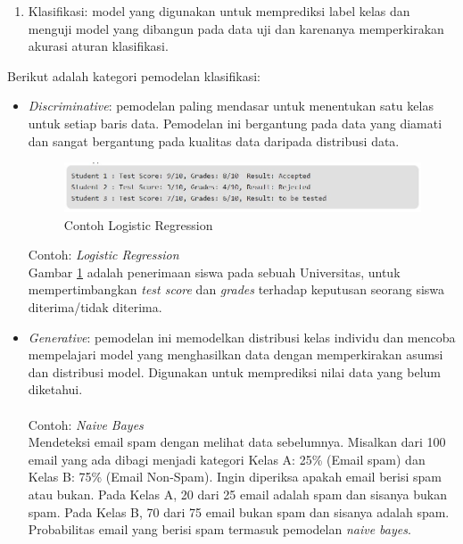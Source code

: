 \documentclass[a4paper,twoside]{article}
\begin{document}
\begin{enumerate}
\begin{enumerate}
\item
Klasifikasi: model yang digunakan untuk memprediksi label kelas dan menguji model yang dibangun pada data uji dan karenanya memperkirakan akurasi aturan klasifikasi.
\end{enumerate}
\vspace{0.3cm}
\noindent Berikut adalah kategori pemodelan klasifikasi:
\begin{itemize}

\item 
\textit{Discriminative}: pemodelan paling mendasar untuk menentukan satu kelas untuk setiap baris data. Pemodelan ini bergantung pada data yang diamati dan sangat bergantung pada kualitas data daripada distribusi data.

\begin{figure}[H]
	\centering
	\includegraphics[scale=0.6]{klasifikasi1}
	\caption{Contoh Logistic Regression}
	\label{fig:klasifikasi1}
\end{figure}

Contoh: \textit{Logistic Regression}\\
Gambar \ref{fig:klasifikasi1} adalah penerimaan siswa pada sebuah Universitas, untuk mempertimbangkan \textit{test score} dan \textit{grades} terhadap keputusan seorang siswa diterima/tidak diterima.

\item 
\textit{Generative}: pemodelan ini memodelkan distribusi kelas individu dan mencoba mempelajari model yang menghasilkan data dengan memperkirakan asumsi dan distribusi model. Digunakan untuk memprediksi nilai data yang belum diketahui. \\\\
Contoh: \textit{Naive Bayes} \\
Mendeteksi email spam dengan melihat data sebelumnya. Misalkan dari 100 email yang ada dibagi menjadi kategori Kelas A: 25\% (Email spam) dan Kelas B: 75\% (Email Non-Spam). Ingin diperiksa apakah email berisi  spam atau bukan. Pada Kelas A, 20 dari 25 email adalah spam dan sisanya bukan spam. Pada Kelas B, 70 dari 75 email bukan spam dan sisanya adalah spam. Probabilitas email yang berisi spam termasuk pemodelan \textit{naive bayes}. \\
\end{itemize}


\end{enumerate}
\end{document}
